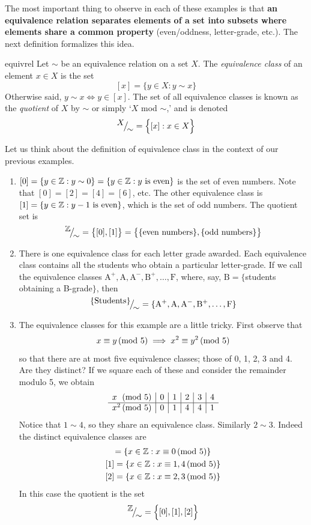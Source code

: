 The most important thing to observe in each of these examples is that {\bf an equivalence relation separates elements of a set into subsets where elements share a common property} (even/oddness, letter-grade, etc.). The next definition formalizes this idea.

\begin{defn}{}{equivrel}
	Let $\sim$ be an equivalence relation on a set $X$. The \emph{equivalence class} of an element $x\in X$ is the set
	\[
		[x]=\{y\in X:y\sim x\}
	\]
	Otherwise said, $y\sim x\iff y\in[x]$. The set of all equivalence classes is known as the \emph{quotient} of $X$ by $\sim$ or simply `$X$ mod $\sim$,' and is denoted
	\[
		{}^{\textstyle {X}}\!\big/_{\textstyle \!{\sim}}=\Big\{[x]:x\in X\Big\}
	\]
\end{defn}

Let us think about the definition of equivalence class in the context of our previous examples.

\begin{examples}{}{}
	\begin{enumerate}
		\item $[0]=\{y\in\mathbb{Z}:y\sim 0\}=\{y\in\mathbb{Z}:y\text{ is even}\}$ is the set of even numbers. Note that $[0]=[2]=[4]=[6]$, etc. The other equivalence class is $[1]=\{y\in\mathbb{Z}:y-1\text{ is even}\}$, which is the set of odd numbers. The quotient set is
		\[
			\smash{{}^{\textstyle {\mathbb{Z}}}\!\big/_{\textstyle \!{\sim}}}=\bigl\{[0],[1]\bigr\}=\bigl\{\{\text{even numbers}\},\{\text{odd numbers}\}\bigr\}
		\]
	
		\item There is one equivalence class for each letter grade awarded. Each equivalence class contains all the students who obtain a particular letter-grade. If we call the equivalence classes $\mathrm{A^+,A,A^-,B^+,\ldots,F}$, where, say, $\mathrm B=\{$students obtaining a B-grade$\}$, then
		\[
			\smash{{}^{\textstyle {\{\text{Students}\}}}\!\big/_{\textstyle \!{\sim}}}=\{\mathrm{A^+,A,A^-,B^+,\ldots,F}\}
		\]
	
		\item The equivalence classes for this example are a little tricky. First observe that
		\[
			x\equiv y\negthickspace\pmod{5}\implies x^2\equiv y^2\negthickspace\pmod{5}
		\]
		so that there are at most five equivalence classes; those of 0, 1, 2, 3 and 4. Are they distinct?	If we square each of these and consider the remainder modulo 5, we obtain
		\[
			\begin{array}{l@{}r|c|c|c|c|c}
				x&\spmod 5&0&1&2&3&4\\\hline
				x^2&\spmod 5&0&1&4&4&1
			\end{array}
		\]
		Notice that $1\sim 4$, so they share an equivalence class. Similarly $2\sim 3$. Indeed the distinct equivalence classes are
		\begin{gather*}
			[0]=\{x\in\Z:x\equiv 0\spmod 5\}\\
			[1]=\{x\in\Z:x\equiv 1,4\spmod 5\}\\
			[2]=\{x\in\Z:x\equiv 2,3\spmod 5\}
		\end{gather*}
		In this case the quotient is the set
		\[
			\smash{{}^{\textstyle {\mathbb{Z}}}\!\big/_{\textstyle \!{\sim}}}=\Bigl\{[0],[1],[2]\Bigr\}
		\]
	\end{enumerate}
\end{examples}

